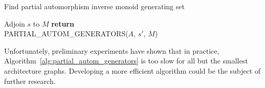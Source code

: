 \begin{algorithm}
  \caption{Find partial automorphism inverse monoid generating set}
  \label{alg:partial_autom_generators}
  \begin{algorithmic}[1]
      \State Adjoin $s$ to $M$
    \Else
      \State \textbf{return}
    \EndIf
    \\
        \State PARTIAL\_AUTOM\_GENERATORS($A$, $s'$, $M$)
    \EndFor
  \EndProcedure
  \end{algorithmic}
\end{algorithm}

Unfortunately, preliminary experiments have shown that in practice,
Algorithm~\ref{alg:partial_autom_generators} is too slow for all but the
smallest architecture graphs. Developing a more efficient algorithm could be
the subject of further research.
